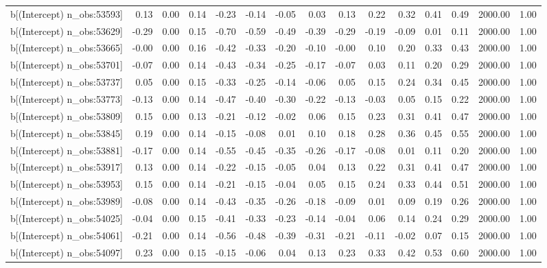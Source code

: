 \begin{table}[ht]
\begin{tabular}{rrrrrrrrrrrrrrr}
  b[(Intercept) n\_obs:53593] & 0.13 & 0.00 & 0.14 & -0.23 & -0.14 & -0.05 & 0.03 & 0.13 & 0.22 & 0.32 & 0.41 & 0.49 & 2000.00 & 1.00 \\ 
  b[(Intercept) n\_obs:53629] & -0.29 & 0.00 & 0.15 & -0.70 & -0.59 & -0.49 & -0.39 & -0.29 & -0.19 & -0.09 & 0.01 & 0.11 & 2000.00 & 1.00 \\ 
  b[(Intercept) n\_obs:53665] & -0.00 & 0.00 & 0.16 & -0.42 & -0.33 & -0.20 & -0.10 & -0.00 & 0.10 & 0.20 & 0.33 & 0.43 & 2000.00 & 1.00 \\ 
  b[(Intercept) n\_obs:53701] & -0.07 & 0.00 & 0.14 & -0.43 & -0.34 & -0.25 & -0.17 & -0.07 & 0.03 & 0.11 & 0.20 & 0.29 & 2000.00 & 1.00 \\ 
  b[(Intercept) n\_obs:53737] & 0.05 & 0.00 & 0.15 & -0.33 & -0.25 & -0.14 & -0.06 & 0.05 & 0.15 & 0.24 & 0.34 & 0.45 & 2000.00 & 1.00 \\ 
  b[(Intercept) n\_obs:53773] & -0.13 & 0.00 & 0.14 & -0.47 & -0.40 & -0.30 & -0.22 & -0.13 & -0.03 & 0.05 & 0.15 & 0.22 & 2000.00 & 1.00 \\ 
  b[(Intercept) n\_obs:53809] & 0.15 & 0.00 & 0.13 & -0.21 & -0.12 & -0.02 & 0.06 & 0.15 & 0.23 & 0.31 & 0.41 & 0.47 & 2000.00 & 1.00 \\ 
  b[(Intercept) n\_obs:53845] & 0.19 & 0.00 & 0.14 & -0.15 & -0.08 & 0.01 & 0.10 & 0.18 & 0.28 & 0.36 & 0.45 & 0.55 & 2000.00 & 1.00 \\ 
  b[(Intercept) n\_obs:53881] & -0.17 & 0.00 & 0.14 & -0.55 & -0.45 & -0.35 & -0.26 & -0.17 & -0.08 & 0.01 & 0.11 & 0.20 & 2000.00 & 1.00 \\ 
  b[(Intercept) n\_obs:53917] & 0.13 & 0.00 & 0.14 & -0.22 & -0.15 & -0.05 & 0.04 & 0.13 & 0.22 & 0.31 & 0.41 & 0.47 & 2000.00 & 1.00 \\ 
  b[(Intercept) n\_obs:53953] & 0.15 & 0.00 & 0.14 & -0.21 & -0.15 & -0.04 & 0.05 & 0.15 & 0.24 & 0.33 & 0.44 & 0.51 & 2000.00 & 1.00 \\ 
  b[(Intercept) n\_obs:53989] & -0.08 & 0.00 & 0.14 & -0.43 & -0.35 & -0.26 & -0.18 & -0.09 & 0.01 & 0.09 & 0.19 & 0.26 & 2000.00 & 1.00 \\ 
  b[(Intercept) n\_obs:54025] & -0.04 & 0.00 & 0.15 & -0.41 & -0.33 & -0.23 & -0.14 & -0.04 & 0.06 & 0.14 & 0.24 & 0.29 & 2000.00 & 1.00 \\ 
  b[(Intercept) n\_obs:54061] & -0.21 & 0.00 & 0.14 & -0.56 & -0.48 & -0.39 & -0.31 & -0.21 & -0.11 & -0.02 & 0.07 & 0.15 & 2000.00 & 1.00 \\ 
  b[(Intercept) n\_obs:54097] & 0.23 & 0.00 & 0.15 & -0.15 & -0.06 & 0.04 & 0.13 & 0.23 & 0.33 & 0.42 & 0.53 & 0.60 & 2000.00 & 1.00 \\ 

\end{tabular}
\end{table}
